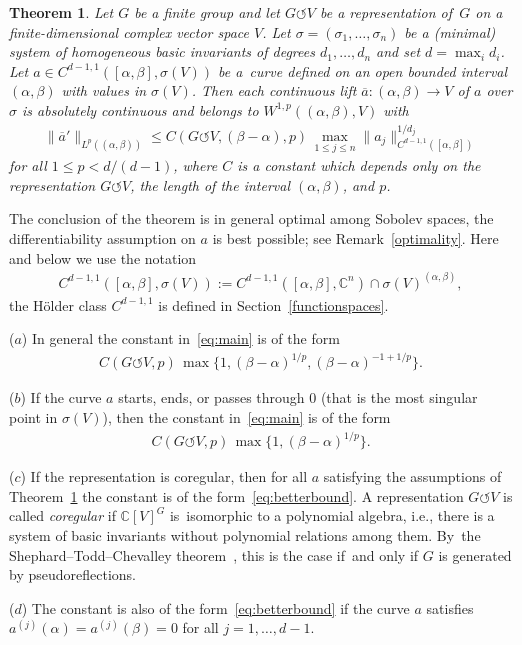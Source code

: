 \documentclass[pdftex]{sigma}
\numberwithin{equation}{section}
\newtheorem{Theorem}{Theorem}[section]
\def\al{\alpha}
\def\be{\beta}
\def\si{\sigma}
\def\C{\mathbb{C}}
\def\ol{\overline}
\def\acts{\circlearrowleft}
\begin{document}
\begin{Theorem}\label{main}
 Let $G$ be a finite group and let $G \acts V$ be a representation of~$G$ on a finite-dimensional
 complex vector space $V$. Let $\si=(\si_1,\dots,\si_n)$ be a (minimal) system of homogeneous
 basic invariants of degrees $d_1,\dots,d_n$ and set $d = \max_i d_i$.
 Let $a \in C^{d-1,1}([\al,\be],\si(V))$ be a~curve
 defined on an open bounded interval
 $(\al,\be)$ with values in $\si(V)$.
 Then each continuous lift $\overline a \colon (\al,\be) \to V$ of $a$ over $\si$ is absolutely continuous and
 belongs to $W^{1,p}((\al,\be),V)$
 with
 \begin{gather} \label{eq:main}
 	 \|\ol a'\|_{L^p((\al,\be))} \le
 C(G \acts V,(\be-\al),p)\, \max_{1 \le j \le n} \|a_j\|^{1/d_j}_{C^{d-1,1}([\al, \be])}		
 	\end{gather}	
 for all $1 \le p < d/(d-1)$,
 where $C$ is a constant which depends only on the representation $G \acts V$, the length of the interval $(\al,\be)$, and $p$.	
\end{Theorem}

{\samepage
The conclusion of the theorem is in general optimal among Sobolev spaces, the differentiability assumption on $a$ is best possible;
see Remark~\ref{optimality}.
Here and below we use the notation
\begin{gather*}
 C^{d-1,1}([\al,\be],\si(V)) := C^{d-1,1}([\al,\be],\C^n) \cap \si(V)^{(\al,\be)},
\end{gather*}
the H\"older class $C^{d-1,1}$ is defined in Section~\ref{functionspaces}.

}

\begin{Remark}\qquad
\label{rem:main}

 ($a$) In general the constant in~\eqref{eq:main} is of the form
 \begin{gather*}
 C(G \acts V,p)\, \max\big\{1, (\be-\al)^{1/p}, (\be-\al)^{-1+1/p} \big\}.
 \end{gather*}

 ($b$) If the curve $a$ starts, ends, or passes through $0$ (that is the most singular point in $\si(V)$),
 then the constant in~\eqref{eq:main} is of the form
 \begin{gather} \label{eq:betterbound}
 C(G \acts V,p)\, \max\big\{1, (\be-\al)^{1/p} \big\}.
 \end{gather}

 ($c$) If the representation is coregular, then for all $a$ satisfying the assumptions of
 Theorem~\ref{main} the constant is of the form~\eqref{eq:betterbound}.
 A representation $G \acts V$ is called \emph{coregular} if $\C[V]^G$ is~isomorphic to a polynomial algebra, i.e.,
 there is a system of basic invariants without polynomial relations among them. By~the Shephard--Todd--Chevalley theorem~\cite{Chevalley:1955aa, Serre:1968aa, Shephard:1954aa},
 this is the case if~and only if $G$ is generated by pseudoreflections.

 ($d$) The constant is also of the form~\eqref{eq:betterbound}
 if the curve $a$ satisfies $a^{(j)}(\al) = a^{(j)}(\be)=0$ for all $j=1,\dots,d-1$.
\end{Remark}	
\end{document}
